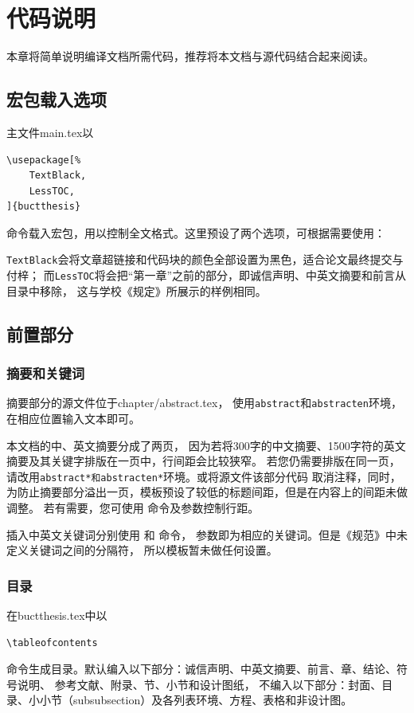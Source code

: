 \chapter{代码说明}\label{chap:CodeIntro}
本章将简单说明编译文档所需代码，推荐将本文档与源代码结合起来阅读。

\section{宏包载入选项}\label{sec:loadsty}
主文件\textsf{main.tex}以
\begin{lstlisting}
\usepackage[%
	TextBlack,
	LessTOC,
]{buctthesis}
\end{lstlisting}
命令载入宏包，用以控制全文格式。这里预设了两个选项，可根据需要使用：

\texttt{TextBlack}会将文章超链接和代码块的颜色全部设置为黑色，适合论文最终提交与付梓；
而\texttt{LessTOC}将会把“第一章”之前的部分，即诚信声明、中英文摘要和前言从目录中移除，
这与学校《规定》所展示的样例相同。

\section{前置部分}\label{sec:frontmatter}
\subsection{摘要和关键词}\label{subsec:abstract}
摘要部分的源文件位于\textsf{chapter/abstract.tex}，
使用\texttt{abstract}和\texttt{abstracten}环境，在相应位置输入文本即可。

本文档的中、英文摘要分成了两页，
因为若将300字的中文摘要、1500字符的英文摘要及其关键字排版在一页中，行间距会比较狭窄。
若您仍需要排版在同一页，请改用\texttt{abstract*和abstracten*}环境。或将源文件该部分代码
取消注释，同时，为防止摘要部分溢出一页，模板预设了较低的标题间距，但是在内容上的间距未做调整。
若有需要，您可使用  命令及参数控制行距。

插入中英文关键词分别使用 和 命令，
参数即为相应的关键词。但是《规范》中未定义关键词之间的分隔符，
所以模板暂未做任何设置。


\subsection{目录}\label{subsec:content}
在\textsf{buctthesis.tex}中以

\begin{lstlisting}[firstnumber=42]
\tableofcontents
	\end{lstlisting}
命令生成目录。默认编入以下部分：诚信声明、中英文摘要、前言、章、结论、符号说明、
参考文献、附录、节、小节和设计图纸，
不编入以下部分：封面、目录、小小节（subsubsection）及各列表环境、方程、表格和非设计图。

